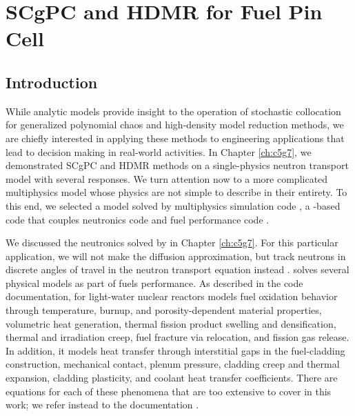 
\chapter{SCgPC and HDMR for Fuel Pin Cell} %

\label{ch:mammoth} %



\section{Introduction}
While analytic models provide insight to the operation of stochastic collocation for generalized polynomial chaos and high-density
model reduction methods, we are chiefly interested in applying these methods to engineering applications that lead to
decision making in real-world activities.  
In Chapter \ref{ch:c5g7}, we demonstrated SCgPC and HDMR methods on a single-physics neutron transport model
with several responses.  We turn attention now to a more complicated multiphysics model whose physics are not
simple to describe in their entirety.
To this end, we selected a model solved by multiphysics simulation code \mammoth{}, a \moose{}-based
code that couples neutronics code \rattlesnake{} \cite{rattlesnake} and fuel performance code \bison{}
\cite{bison}.

We discussed the neutronics solved by \rattlesnake{} in Chapter \ref{ch:c5g7}.  For this particular
application, we will not make the diffusion approximation, but track neutrons in discrete angles of travel
in the neutron transport equation instead \cite{lewistrans}.  \bison{} solves several physical models as part
of fuels performance.  As described in the code documentation, for light-water nuclear reactors \bison{} models 
fuel oxidation behavior through
temperature, burnup, and porosity-dependent material properties, volumetric heat generation, thermal fission
product swelling and densification, thermal and irradiation creep, fuel fracture via relocation, and fission
gas release.  In addition, it models heat transfer through interstitial gaps in the fuel-cladding
construction, mechanical contact, plenum pressure, cladding creep and thermal expansion, cladding plasticity,
and coolant heat transfer coefficients.  There are equations for each of these phenomena that are too
extensive to cover in this work; we refer instead to the \bison{} documentation \cite{bison}.

